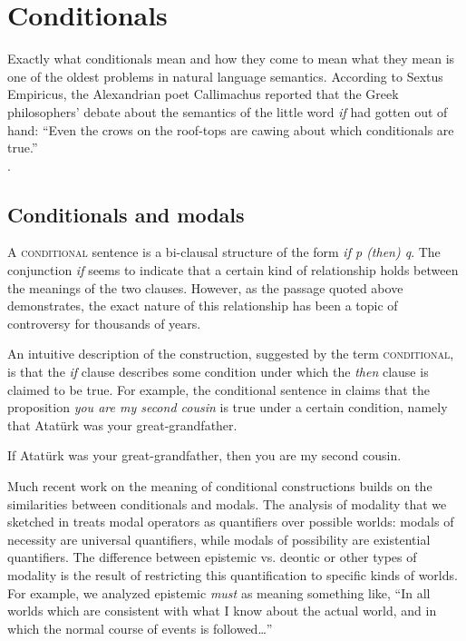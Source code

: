 \chapter{Conditionals}\label{sec:19}

\begin{flushright} 
\parbox{.7\textwidth}{\small%
Exactly what conditionals mean and how they come to mean what they mean is one of the oldest problems in natural language semantics. According to Sextus Empiricus, the Alexandrian poet Callimachus reported that the Greek philosophers’ debate about the semantics of the little word \textit{if} had gotten out of hand: “Even the crows on the roof-tops are cawing about which conditionals are true.”\\ \hbox {}\hfill \citep{vonFintel2011}.}\end{flushright}

\section{Conditionals and modals}\label{sec:19.1}

A \textsc{conditional} sentence is a bi-clausal structure of the form \textit{if p (then) q}. The conjunction \textit{if} seems to indicate that a certain kind of relationship holds between the meanings of the two clauses. However, as the passage quoted above demonstrates, the exact nature of this relationship has been a topic of controversy for thousands of years.



An intuitive description of the construction, suggested by the term \textsc{conditional}, is that the \textit{if} clause describes some condition under which the \textit{then} clause is claimed to be true. For example, the conditional sentence in  claims that the proposition \textit{you are my second cousin} is true under a certain condition, namely that Atatürk was your great-grandfather.


\ea \label{ex:19.1}
If Atatürk was your great-grandfather, then you are my second cousin.
\z


Much recent work on the meaning of conditional constructions builds on the similarities between conditionals and modals. The analysis of modality that we sketched in  treats modal operators as quantifiers over possible worlds: modals of necessity are universal quantifiers, while modals of possibility are existential quantifiers. The difference between epistemic vs. deontic or other types of modality is the result of restricting this quantification to specific kinds of worlds. For example, we analyzed epistemic \textit{must} as meaning something like, “In all worlds which are consistent with what I know about the actual world, and in which the normal course of events is followed…”



